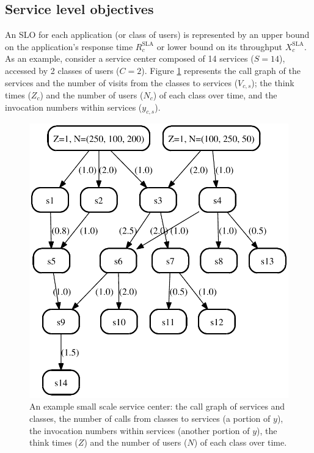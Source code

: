 \subsection{Service level objectives} An SLO for each application (or class of users) is represented by an upper bound on the application's response time $R_{c}^\text{SLA}$  or lower bound on its throughput $X_{c}^\text{SLA}$.   
As an example, consider a service center composed of 14 services ($S=14$), accessed by 2 classes of users ($C=2$). 
Figure \ref{fig:service_call_graph} represents the call graph of the services and 
the number of visits from the classes to services ($V_{c,s}$); 
the think times ($Z_c$) and 
the number of users ($N_c$) of each class over time, and 
the invocation numbers within services ($y_{c,s}$). 
\begin{figure}[htbp]
\begin{center}
 \includegraphics[scale=0.8]{image/placement/example1services}
 \caption[An example small scale service center.]{An example small scale service center: the call graph of services and classes, the number of calls from classes to services (a portion of $y$), the invocation numbers within services (another portion of $y$), the think times ($Z$) and the number of users ($N$) of each class over time. }
\label{fig:service_call_graph}
\end{center}
\end{figure}

